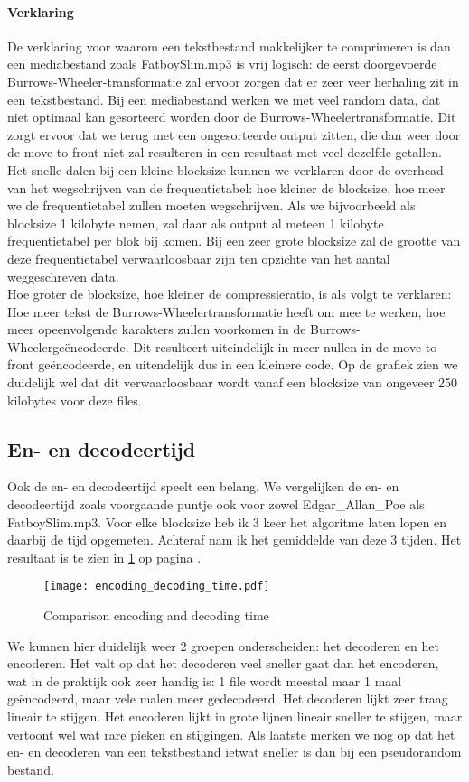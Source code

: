 \documentclass[11pt,a4paper]{article}
\begin{document}
\paragraph*{Verklaring} De verklaring voor waarom een tekstbestand makkelijker te comprimeren is dan een mediabestand zoals FatboySlim.mp3 is vrij logisch: de eerst doorgevoerde Burrows-Wheeler-transformatie zal ervoor zorgen dat er zeer veer herhaling zit in een tekstbestand. Bij een mediabestand werken we met veel random data, dat niet optimaal kan gesorteerd worden door de Burrows-Wheelertransformatie. Dit zorgt ervoor dat we terug met een ongesorteerde output zitten, die dan weer door de move to front niet zal resulteren in een resultaat met veel dezelfde getallen.\\
Het snelle dalen bij een kleine blocksize kunnen we verklaren door de overhead van het wegschrijven van de frequentietabel: hoe kleiner de blocksize, hoe meer we de frequentietabel zullen moeten wegschrijven. Als we bijvoorbeeld als blocksize 1 kilobyte nemen, zal daar als output al meteen 1 kilobyte frequentietabel per blok bij komen. Bij een zeer grote blocksize zal de grootte van deze frequentietabel verwaarloosbaar zijn ten opzichte van het aantal weggeschreven data.\\
Hoe groter de blocksize, hoe kleiner de compressieratio, is als volgt te verklaren: Hoe meer tekst de Burrows-Wheelertransformatie heeft om mee te werken, hoe meer opeenvolgende karakters zullen voorkomen in de Burrows-Wheelerge\"encodeerde. Dit resulteert uiteindelijk in meer nullen in de move to front ge\"encodeerde, en uitendelijk dus in een kleinere code. Op de grafiek zien we duidelijk wel dat dit verwaarloosbaar wordt vanaf een blocksize van ongeveer 250 kilobytes voor deze files.

\subsection{En- en decodeertijd}
Ook de en- en decodeertijd speelt een belang. We vergelijken de en- en decodeertijd zoals voorgaande puntje ook voor zowel Edgar\_Allan\_Poe als FatboySlim.mp3. Voor elke blocksize heb ik 3 keer het algoritme laten lopen en daarbij de tijd opgemeten. Achteraf nam ik het gemiddelde van deze 3 tijden. Het resultaat is te zien in \ref{tijd} op pagina \pageref{tijd}.
\begin{figure}[h!]
  \centering
    \texttt{[image: encoding\_decoding\_time.pdf]}
    \caption{Comparison encoding and decoding time}
  \label{tijd}
\end{figure}
We kunnen hier duidelijk weer 2 groepen onderscheiden: het decoderen en het encoderen. Het valt op dat het decoderen veel sneller gaat dan het encoderen, wat in de praktijk ook zeer handig is: 1 file wordt meestal maar 1 maal ge\"encodeerd, maar vele malen meer gedecodeerd. Het decoderen lijkt zeer traag lineair te stijgen. Het encoderen lijkt in grote lijnen lineair sneller te stijgen, maar vertoont wel wat rare pieken en stijgingen. Als laatste merken we nog op dat het en- en decoderen van een tekstbestand ietwat sneller is dan bij een pseudorandom bestand.
\end{document}
